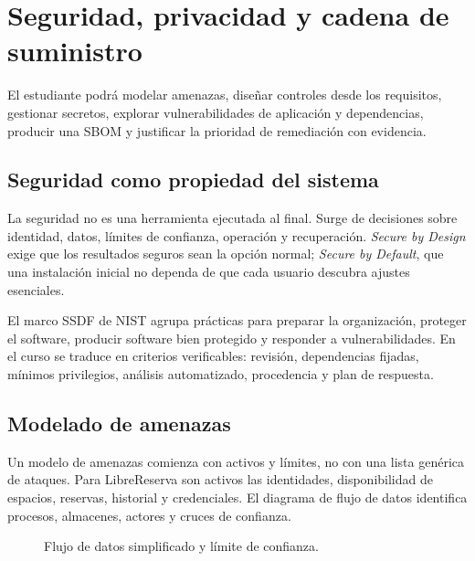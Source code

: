 \chapter{Seguridad, privacidad y cadena de suministro}
\label{chap:seguridad}

\begin{objetivos}
El estudiante podrá modelar amenazas, diseñar controles desde los requisitos, gestionar secretos, explorar vulnerabilidades de aplicación y dependencias, producir una SBOM y justificar la prioridad de remediación con evidencia.
\end{objetivos}

\section{Seguridad como propiedad del sistema}

La seguridad no es una herramienta ejecutada al final. Surge de decisiones sobre identidad, datos, límites de confianza, operación y recuperación. \emph{Secure by Design} exige que los resultados seguros sean la opción normal; \emph{Secure by Default}, que una instalación inicial no dependa de que cada usuario descubra ajustes esenciales.

El marco SSDF de NIST agrupa prácticas para preparar la organización, proteger el software, producir software bien protegido y responder a vulnerabilidades. En el curso se traduce en criterios verificables: revisión, dependencias fijadas, mínimos privilegios, análisis automatizado, procedencia y plan de respuesta.

\section{Modelado de amenazas}

Un modelo de amenazas comienza con activos y límites, no con una lista genérica de ataques. Para LibreReserva son activos las identidades, disponibilidad de espacios, reservas, historial y credenciales. El diagrama de flujo de datos identifica procesos, almacenes, actores y cruces de confianza.

\begin{figure}[htbp]
\centering
{}
\caption{Flujo de datos simplificado y límite de confianza.}
\end{figure}

